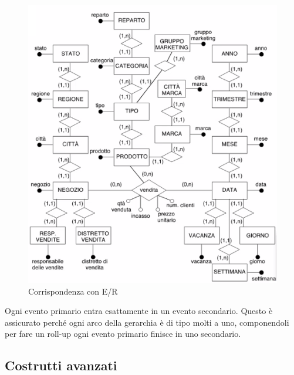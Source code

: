 \begin{figure}[H]
	\begin{center}
		\includegraphics[width=0.7\linewidth]{img/erger.png}
		\caption{Corrispondenza con E/R}
	\end{center}
\end{figure}

\noindent Ogni evento primario entra esattamente in un evento secondario. Questo è assicurato perché ogni arco della gerarchia è di tipo molti a uno, componendoli per fare un roll-up ogni evento primario finisce in uno secondario.\newline

\subsection{Costrutti avanzati}

